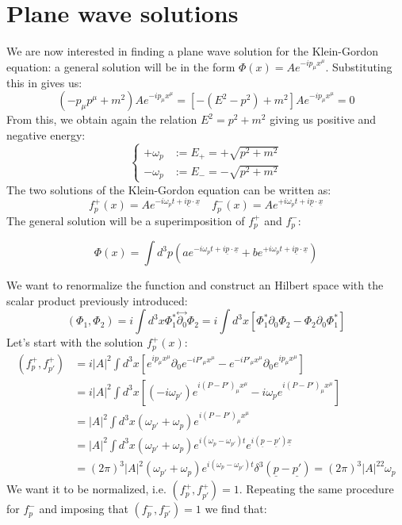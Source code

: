 \documentclass[../main.tex]{subfiles}
\begin{document}
\section{Plane wave solutions}
We are now interested in finding a plane wave solution for the Klein-Gordon equation: a general solution will be in the form $\Phi(x)=Ae^{-ip_\mu x^\mu}$. Substituting this in  gives us:
\[
(-p_\mu p^\mu+m^2)Ae^{-ip_\mu x^\mu}=[-(E^2-p^2)+m^2]Ae^{-ip_\mu x^\mu}=0
\]
From this, we obtain again the relation $E^2=p^2+m^2$ giving us positive and negative energy:
\[
\left\{
\begin{aligned}
+\omega_p&:=E_+=+\sqrt{p^2+m^2}\\
-\omega_p&:=E_-=-\sqrt{p^2+m^2}
\end{aligned}
\right.
\]
The two solutions of the Klein-Gordon equation can be written as:
\[
f^+_p(x)=Ae^{-i\omega_pt+i\underline{p}\cdot\underline{x}} \quad f^-_p(x)=Ae^{+i\omega_pt+i\underline{p}\cdot\underline{x}}
\]
The general solution will be a superimposition of $f^+_p$ and $f^-_p$:
\begin{kaobox}[frametitle=Solution of the Klein-Gordon equation]
\[
\Phi(x)=\int d^3p\left(ae^{-i\omega_pt+i\underline{p}\cdot\underline{x}}+be^{+i\omega_pt+i\underline{p}\cdot\underline{x}}\right)
\]
\end{kaobox}
We want to renormalize the function and construct an Hilbert space with the scalar product previously introduced:
\[
(\Phi_1,\Phi_2)=i\int d^3x\Phi^*_1\overset{\leftrightarrow}{\partial_0}\Phi_2=i\int d^3x\left[\Phi^*_1\partial_0\Phi_2-\Phi_2\partial_0\Phi^*_1\right]
\]
Let's start with the solution $f^+_p(x)$:
\begin{align*}
(f_p^+,f_{p'}^+)&=i|A|^2\int d^3x\left[e^{ip_\mu x^\mu}\partial_0e^{-iP'_\mu x^\mu}-e^{-iP'_\mu x^\mu}\partial_0e^{ip_\mu x^\mu}\right]\\
&=i|A|^2\int d^3x\left[(-i\omega_{p'})e^{i(P-P')_\mu x^\mu}-i\omega_pe^{i(P-P')_\mu x^\mu}\right]\\
&=|A|^2\int d^3x(\omega_{p'}+\omega_p)e^{i(P-P')_\mu x^\mu}\\
&=|A|^2\int d^3x(\omega_{p'}+\omega_p)e^{i(\omega_p-\omega_{p'})t}e^{i(\underline{p}-\underline{p}')\underline{x}}\\
&=(2\pi)^3|A|^2(\omega_{p'}+\omega_p)e^{i(\omega_p-\omega_{p'})t}\delta^3(\underline{p}-\underline{p'})=(2\pi)^3|A|^22\omega_p
\end{align*}
We want it to be normalized, i.e. $(f_p^+,f_{p'}^+)=1$. Repeating the same procedure for $f^-_p$ and imposing that $(f^-_p,f^-_{p'})=1$ we find that:
\end{document}

